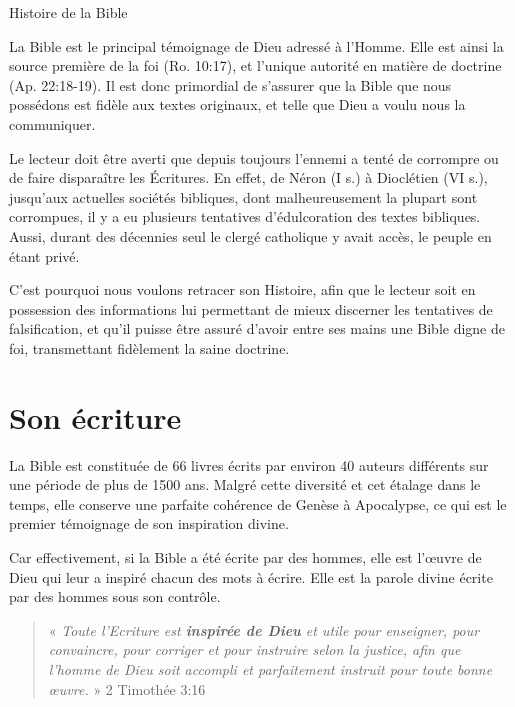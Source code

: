 \begin{center}{\LARGE Histoire de la Bible}\end{center}
\begin{small}

La Bible est le principal témoignage de Dieu adressé à l'Homme. Elle est ainsi la source première de la foi (Ro. 10:17), et l'unique autorité en matière de doctrine (Ap. 22:18-19). Il est donc primordial de s'assurer que la Bible que nous possédons est fidèle aux textes originaux, et telle que Dieu a voulu nous la communiquer.\bigskip

Le lecteur doit être averti que depuis toujours l'ennemi a tenté de corrompre ou de faire disparaître les Écritures. En effet, de Néron (I s.) à Dioclétien (VI s.), jusqu'aux actuelles sociétés bibliques, dont malheureusement la plupart sont corrompues, il y a eu plusieurs tentatives d'édulcoration des textes bibliques. Aussi, durant des décennies seul le clergé catholique y avait accès, le peuple en étant privé.\bigskip

C'est pourquoi nous voulons retracer son Histoire, afin que le lecteur soit en possession des informations lui permettant de mieux discerner les tentatives de falsification, et qu'il puisse être assuré d'avoir entre ses mains une Bible digne de foi, transmettant fidèlement la saine doctrine.

\section*{Son écriture}

La Bible est constituée de 66 livres écrits par environ 40 auteurs différents sur une période de plus de 1500 ans. Malgré cette diversité et cet étalage dans le temps, elle conserve une parfaite cohérence de Genèse à Apocalypse, ce qui est le premier témoignage de son inspiration divine.\bigskip

Car effectivement, si la Bible a été écrite par des hommes, elle est l'œuvre de Dieu qui leur a inspiré chacun des mots à écrire. Elle est la parole divine écrite par des hommes sous son contrôle.

\begin{quote}
« \emph{Toute l'Ecriture est \textbf{inspirée de Dieu} et utile pour enseigner, pour convaincre, pour corriger et pour instruire selon la justice, afin que l'homme de Dieu soit accompli et parfaitement instruit pour toute bonne œuvre.} » 2 Timothée 3:16
\end{quote}


\end{small}
